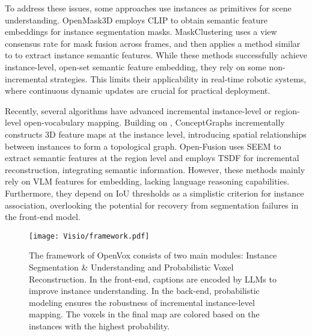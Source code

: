 To address these issues, some approaches use instances as primitives for scene understanding. OpenMask3D \cite{takmaz2023openmask3d} employs CLIP to obtain semantic feature embeddings for instance segmentation masks. MaskClustering \cite{maskclustering} uses a view consensus rate for mask fusion across frames, and then applies a method similar to \cite{takmaz2023openmask3d} to extract instance semantic features.
While these methods successfully achieve instance-level, open-set semantic feature embedding, they rely on some non-incremental strategies. This limits their applicability in real-time robotic systems, where continuous dynamic updates are crucial for practical deployment.

Recently, several algorithms have advanced incremental instance-level or region-level open-vocabulary mapping. Building on \cite{conceptfusion}, ConceptGraphs \cite{conceptgraphs} incrementally constructs 3D feature maps at the instance level, introducing spatial relationships between instances to form a topological graph. Open-Fusion \cite{open-fusion} uses SEEM to extract semantic features at the region level and employs TSDF for incremental reconstruction, integrating semantic information.
However, these methods mainly rely on VLM features for embedding, lacking language reasoning capabilities. Furthermore, they depend on IoU thresholds as a simplistic criterion for instance association, overlooking the potential for recovery from segmentation failures in the front-end model.






\begin{figure*}
    \centering
    \texttt{[image: Visio/framework.pdf]}
    \caption{The framework of OpenVox consists of two main modules: Instance Segmentation \& Understanding and Probabilistic Voxel Reconstruction. In the front-end, captions are encoded by LLMs to improve instance understanding. In the back-end, probabilistic modeling ensures the robustness of incremental instance-level mapping. The voxels in the final map are colored based on the instances with the highest probability.}
    \label{overview}
\end{figure*}